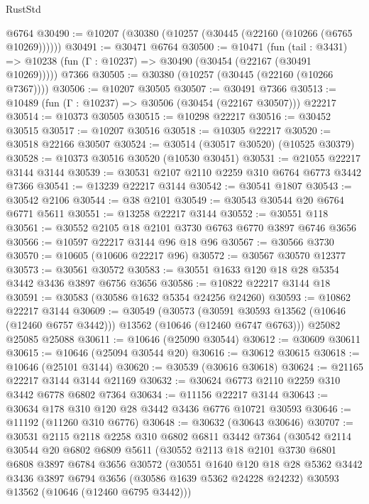 \begin{lexlean}{RustStd}
\begin{coremodule}
    @6764
@30490 := @10207 (@30380 (@10257 (@30445 (@22160 (@10266 (@6765 @10269))))))
@30491 := @30471 @6764
@30500 := @10471
    (fun (tail : @3431) => @10238 (fun (Γ : @10237) => @30490 (@30454 (@22167 (@30491 @10269)))))
    @7366
@30505 := @30380 (@10257 (@30445 (@22160 (@10266 @7367))))
@30506 := @10207 @30505
@30507 := @30491 @7366
@30513 := @10489 (fun (Γ : @10237) => @30506 (@30454 (@22167 @30507))) @22217
@30514 := @10373 @30505
@30515 := @10298 @22217
@30516 := @30452 @30515
@30517 := @10207 @30516
@30518 := @10305 @22217
@30520 := @30518 @22166 @30507
@30524 := @30514 (@30517 @30520) (@10525 @30379)
@30528 := @10373 @30516 @30520 (@10530 @30451)
@30531 := @21055 @22217 @3144 @3144
@30539 := @30531 @2107 @2110 @2259 @310 @6764 @6773 @3442 @7366
@30541 := @13239 @22217 @3144
@30542 := @30541 @1807
@30543 := @30542 @2106
@30544 := @38 @2101
@30549 := @30543 @30544 @20 @6764 @6771 @5611
@30551 := @13258 @22217 @3144
@30552 := @30551 @118
@30561 := @30552 @2105 @18 @2101 @3730 @6763 @6770 @3897 @6746 @3656
@30566 := @10597 @22217 @3144 @96 @18 @96
@30567 := @30566 @3730
@30570 := @10605 (@10606 @22217 @96)
@30572 := @30567 @30570 @12377
@30573 := @30561 @30572
@30583 := @30551 @1633 @120 @18 @28 @5354 @3442 @3436 @3897 @6756 @3656
@30586 := @10822 @22217 @3144 @18
@30591 := @30583 (@30586 @1632 @5354 @24256 @24260)
@30593 := @10862 @22217 @3144
@30609 := @30549
    (@30573
      (@30591 @30593 @13562 (@10646 (@12460 @6757 @3442)))
      @13562
      (@10646 (@12460 @6747 @6763)))
    @25082
    @25085
    @25088
@30611 := @10646 (@25090 @30544)
@30612 := @30609 @30611
@30615 := @10646 (@25094 @30544 @20)
@30616 := @30612 @30615
@30618 := @10646 (@25101 @3144)
@30620 := @30539 (@30616 @30618)
@30624 := @21165 @22217 @3144 @3144 @21169
@30632 := @30624 @6773 @2110 @2259 @310 @3442 @6778 @6802 @7364
@30634 := @11156 @22217 @3144
@30643 := @30634 @178 @310 @120 @28 @3442 @3436 @6776 @10721 @30593
@30646 := @11192 (@11260 @310 @6776)
@30648 := @30632 (@30643 @30646)
@30707 := @30531
    @2115
    @2118
    @2258
    @310
    @6802
    @6811
    @3442
    @7364
    (@30542
      @2114
      @30544
      @20
      @6802
      @6809
      @5611
      (@30552
        @2113
        @18
        @2101
        @3730
        @6801
        @6808
        @3897
        @6784
        @3656
        @30572
        (@30551
          @1640
          @120
          @18
          @28
          @5362
          @3442
          @3436
          @3897
          @6794
          @3656
          (@30586 @1639 @5362 @24228 @24232)
          @30593
          @13562
          (@10646 (@12460 @6795 @3442)))

\end{coremodule}
\end{lexlean}

